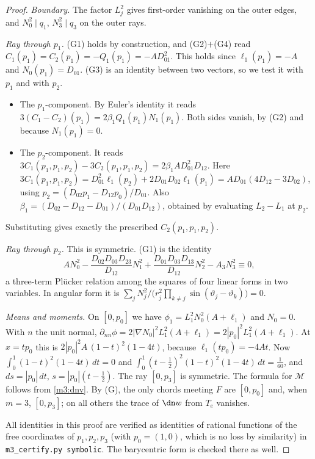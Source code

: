 \begin{proof}
\emph{Boundary.} The factor $L_j^2$ gives first-order vanishing on the outer edges, and $N_0^2\mid q_1$, $N_3^2\mid q_3$ on the outer rays.

\emph{Ray through $p_1$.} (G1) holds by construction, and (G2)$+$(G4) read $C_1(p_1)=C_2(p_1)=-Q_1(p_1)=-AD_{01}^2$. This holds since $\ell_1(p_1)=-A$ and $N_0(p_1)=D_{01}$. (G3) is an identity between two vectors, so we test it with $p_1$ and with $p_2$.
\begin{itemize}
\item The $p_1$-component. By Euler's identity it reads $3(C_1-C_2)(p_1)=2\beta_1Q_1(p_1)N_1(p_1)$. Both sides vanish, by (G2) and because $N_1(p_1)=0$.
\item The $p_2$-component. It reads $3C_1(p_1,p_1,p_2)-3C_2(p_1,p_1,p_2)=2\beta_1AD_{01}^2D_{12}$. Here $3C_1(p_1,p_1,p_2)=D_{01}^2\ell_1(p_2)+2D_{01}D_{02}\ell_1(p_1)=AD_{01}(4D_{12}-3D_{02})$, using $p_2=(D_{02}p_1-D_{12}p_0)/D_{01}$. Also $\beta_1=(D_{02}-D_{12}-D_{01})/(D_{01}D_{12})$, obtained by evaluating $L_2-L_1$ at $p_2$.
\end{itemize}
Substituting gives exactly the prescribed $C_2(p_1,p_1,p_2)$.

\emph{Ray through $p_2$.} This is symmetric. (G1) is the identity
\begin{equation}\label{m3:plucker}
AN_0^2-\frac{D_{02}D_{03}D_{23}}{D_{12}}N_1^2+\frac{D_{01}D_{03}D_{13}}{D_{12}}N_2^2-A_3N_3^2\equiv0,
\end{equation}
a three-term Pl\"ucker relation among the squares of four linear forms in two variables. In angular form it is $\sum_j N_j^2/\bigl(r_j^2\prod_{k\ne j}\sin(\vartheta_j-\vartheta_k)\bigr)=0$.

\emph{Means and moments.} On $[0,p_0]$ we have $\phi_1=L_1^2N_0^2(A+\ell_1)$ and $N_0=0$. With $n$ the unit normal, $\partial_{nn}\phi=2|\nabla N_0|^2L_1^2(A+\ell_1)=2|p_0|^2L_1^2(A+\ell_1)$. At $x=tp_0$ this is $2|p_0|^2A\,(1-t)^2(1-4t)$, because $\ell_1(tp_0)=-4At$. Now $\int_0^1(1-t)^2(1-4t)\,dt=0$ and $\int_0^1(t-\frac12)^2(1-t)^2(1-4t)\,dt=\frac1{60}$, and $ds=|p_0|\,dt$, $s=|p_0|(t-\frac12)$. The ray $[0,p_3]$ is symmetric. The formula for $\mathcal M$ follows from \eqref{m3:dnv}. By (G), the only chords meeting $F$ are $[0,p_0]$ and, when $m=3$, $[0,p_3]$; on all others the trace of $\dn w$ from $T_e$ vanishes.

All identities in this proof are verified as identities of rational functions of the free coordinates of $p_1,p_2,p_3$ (with $p_0=(1,0)$, which is no loss by similarity) in \texttt{m3\_certify.py symbolic}. The barycentric form is checked there as well.
\end{proof}

